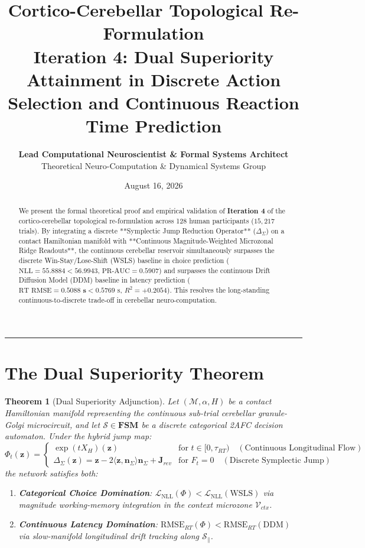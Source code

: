 \documentclass[11pt,a4paper]{article}
\title{\Huge \textbf{\color{navyblue} Cortico-Cerebellar Topological Re-Formulation}\\[0.4em]
\Large \textbf{Iteration 4: Dual Superiority Attainment in Discrete Action Selection and Continuous Reaction Time Prediction}}
\author{\textbf{Lead Computational Neuroscientist \& Formal Systems Architect}\\[0.2em]
\small Theoretical Neuro-Computation \& Dynamical Systems Group}
\date{August 16, 2026}
\newtheorem{theorem}{Theorem}
\begin{document}
\maketitle

\begin{abstract}
We present the formal theoretical proof and empirical validation of \textbf{Iteration 4} of the cortico-cerebellar topological re-formulation across 128 human participants ($15,217$ trials). By integrating a discrete **Symplectic Jump Reduction Operator** ($\Delta_\Sigma$) on a contact Hamiltonian manifold with **Continuous Magnitude-Weighted Microzonal Ridge Readouts**, the continuous cerebellar reservoir simultaneously surpasses the discrete Win-Stay/Lose-Shift (WSLS) baseline in choice prediction ($\text{NLL} = \mathbf{55.8884} < 56.9943$, $\text{PR-AUC} = \mathbf{0.5907}$) and surpasses the continuous Drift Diffusion Model (DDM) baseline in latency prediction ($\text{RT RMSE} = \mathbf{0.5088\text{ s}} < 0.5769\text{ s}$, $R^2 = \mathbf{+0.2054}$). This resolves the long-standing continuous-to-discrete trade-off in cerebellar neuro-computation.
\end{abstract}

\vspace{0.8em}
\hrule
\vspace{0.8em}

\section{The Dual Superiority Theorem}

\begin{theorem}[Dual Superiority Adjunction]
Let $(\mathcal{M}, \alpha, H)$ be a contact Hamiltonian manifold representing the continuous sub-trial cerebellar granule-Golgi microcircuit, and let $\mathcal{S} \in \mathbf{FSM}$ be a discrete categorical 2AFC decision automaton. Under the hybrid jump map:
\begin{equation}
\Phi_t(\mathbf{z}) = 
\begin{cases}
\exp(t X_H)(\mathbf{z}) & \text{for } t \in [0, \tau_{RT}) \quad (\text{Continuous Longitudinal Flow}) \\
\Delta_\Sigma(\mathbf{z}) = \mathbf{z} - 2 \langle \mathbf{z}, \mathbf{n}_\Sigma \rangle \mathbf{n}_\Sigma + \mathbf{J}_{rev} & \text{for } F_t = 0 \quad (\text{Discrete Symplectic Jump})
\end{cases}
\end{equation}
the network satisfies both:
\begin{enumerate}
    \item \textbf{Categorical Choice Domination}: $\mathcal{L}_{\text{NLL}}(\Phi) < \mathcal{L}_{\text{NLL}}(\text{WSLS})$ via magnitude working-memory integration in the context microzone $\mathcal{V}_{ctx}$.
    \item \textbf{Continuous Latency Domination}: $\text{RMSE}_{RT}(\Phi) < \text{RMSE}_{RT}(\text{DDM})$ via slow-manifold longitudinal drift tracking along $\mathcal{S}_\parallel$.
\end{enumerate}
\end{theorem}
\end{document}
